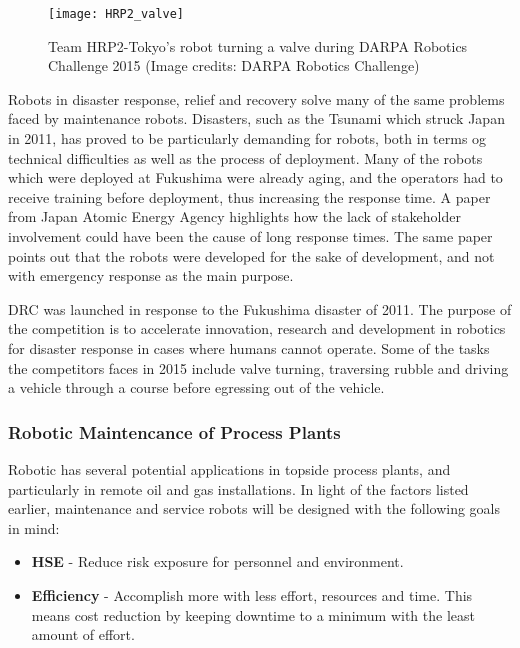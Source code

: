 \begin{wrapfigure}{r}{0.5\textwidth}
	\begin{center}
		\texttt{[image: HRP2\_valve]}
	\end{center}
	
	\caption{Team HRP2-Tokyo's robot turning a valve during DARPA Robotics Challenge 2015 (Image credits: DARPA Robotics Challenge)}
\end{wrapfigure}

Robots in disaster response, relief and recovery solve many of the same problems faced by maintenance robots. Disasters, such as the Tsunami which struck Japan in 2011, has proved to be particularly demanding for robots, both in terms og technical difficulties as well as the process of deployment. Many of the robots which were deployed at Fukushima were already aging, and the operators had to receive training before deployment, thus increasing the response time\cite{doi:10.1108/01439911211249715}. A paper from Japan Atomic Energy Agency\cite{doi:10.1108/01439911211249715} highlights how the lack of stakeholder involvement could have been the cause of long response times. The same paper points out that the robots were developed for the sake of development, and not with emergency response as the main purpose\cite{doi:10.1108/01439911211249715}. 

\ac{DRC}\cite{DRC} was launched in response to the Fukushima disaster of 2011. The purpose of the competition is to accelerate innovation, research and development in robotics for disaster response in cases where humans cannot operate. Some of the tasks the competitors faces in 2015 include valve turning, traversing rubble and driving a vehicle through a course before egressing out of the vehicle.

\subsubsection{Robotic Maintencance of Process Plants}

Robotic has several potential applications in topside process plants, and particularly in remote oil and gas installations. In light of the factors listed earlier, maintenance and service robots will be designed with the following goals in mind\cite{AutonomousOG}:

\begin{itemize}
	\item \textbf{HSE} - Reduce risk exposure for personnel and environment. 
	\item \textbf{Efficiency} - Accomplish more with less effort, resources and time. This means cost reduction by keeping downtime to a minimum with the least amount of effort.
\end{itemize} 

